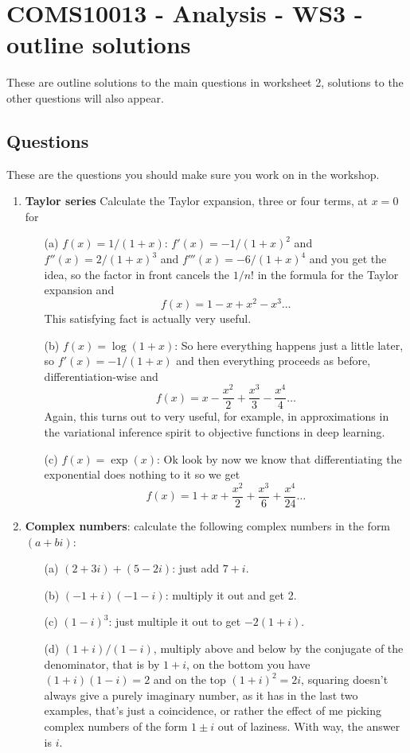 \documentclass[11pt,a4paper]{scrartcl}
\begin{document}
\section*{COMS10013 - Analysis - WS3 - outline solutions}

These are outline solutions to the main questions in worksheet 2, solutions to the other questions will also appear.

\subsection*{Questions}

These are the questions you should make sure you work on in the workshop.

\begin{enumerate}

\item \textbf{Taylor series} Calculate the Taylor expansion, three or four terms, at $x=0$ for
	\begin{itemize}
	\item[(a)] $f(x)=1/(1+x)$: $f'(x)=-1/(1+x)^2$ and $f''(x)=2/(1+x)^3$ and $f'''(x)=-6/(1+x)^4$ and you get the idea, so the factor in front cancels the $1/n!$ in the formula for the Taylor expansion and
          $$f(x)=1-x+x^2-x^3\ldots$$
          This satisfying fact is actually very useful.
	\item[(b)] $f(x)=\log{(1+x)}$: So here everything happens just a little later, so $f'(x)=-1/(1+x)$ and then everything proceeds as before, differentiation-wise and
          $$f(x)=x-\frac{x^2}{2}+\frac{x^3}{3}-\frac{x^4}{4}\ldots$$
          Again, this turns out to very useful, for example, in approximations in the variational inference spirit to objective functions in deep learning.
	\item[(c)] $f(x)=\exp{(x)}$: Ok look by now we know that differentiating the exponential does nothing to it so we get
          $$f(x)=1+x+\frac{x^2}{2}+\frac{x^3}{6}+\frac{x^4}{24}\ldots$$

\end{itemize}

\item \textbf{Complex numbers}: calculate the following complex numbers in the form $(a+bi)$: 
	\begin{itemize}
		\item[(a)] $(2+3i) + (5-2i)$: just add $7+i$.
		\item[(b)] $(-1+i)(-1-i)$: multiply it out and get 2.
		\item[(c)] $(1-i)^3$: just multiple it out to get $-2(1+i)$.
		\item[(d)] $(1+i)/(1-i)$, multiply above and below by the conjugate of the denominator, that is by $1+i$, on the bottom you have $(1+i)(1-i)=2$ and on the top $(1+i)^2=2i$, squaring doesn't always give a purely imaginary number, as it has in the last two examples, that's just a coincidence, or rather the effect of me picking complex numbers of the form $1\pm i$ out of laziness. With way, the answer is $i$. 
	\end{itemize}


\end{enumerate}
\end{document}
